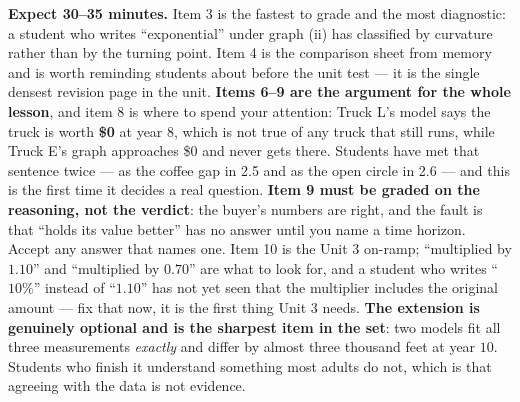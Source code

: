 \documentclass[10pt]{article}
\begin{document}
\boxguard[18]
\begin{teachernote}[Homework]
    \textbf{Expect 30--35 minutes.} Item 3 is the fastest to grade and the most diagnostic: a student
    who writes ``exponential'' under graph (ii) has classified by curvature rather than by the turning
    point. Item 4 is the comparison sheet from memory and is worth reminding students about before the
    unit test --- it is the single densest revision page in the unit. \textbf{Items 6--9 are the
    argument for the whole lesson}, and item 8 is where to spend your attention: Truck L's model says
    the truck is worth \textbf{\$0} at year $8$, which is not true of any truck that still runs, while
    Truck E's graph approaches \$0 and never gets there. Students have met that sentence twice --- as
    the coffee gap in 2.5 and as the open circle in 2.6 --- and this is the first time it decides a
    real question. \textbf{Item 9 must be graded on the reasoning, not the verdict}: the buyer's
    numbers are right, and the fault is that ``holds its value better'' has no answer until you name a
    time horizon. Accept any answer that names one. Item 10 is the Unit 3 on-ramp; ``multiplied by
    $1.10$'' and ``multiplied by $0.70$'' are what to look for, and a student who writes ``$10\%$''
    instead of ``$1.10$'' has not yet seen that the multiplier includes the original amount --- fix
    that now, it is the first thing Unit 3 needs. \textbf{The extension is genuinely optional and is
    the sharpest item in the set}: two models fit all three measurements \emph{exactly} and differ by
    almost three thousand feet at year $10$. Students who finish it understand something most adults
    do not, which is that agreeing with the data is not evidence.
\end{teachernote}
\end{document}
